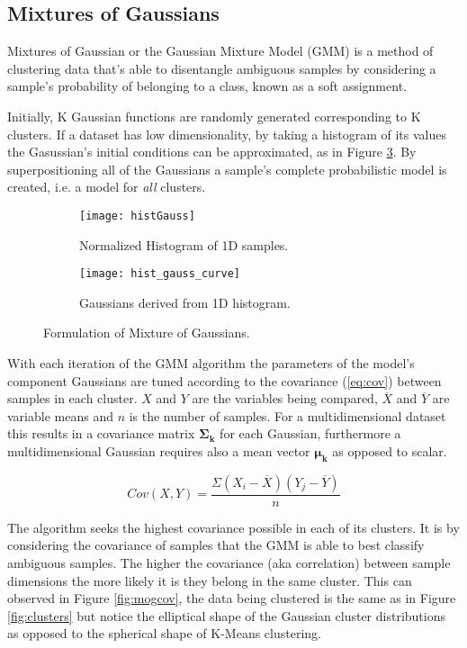  \subsection{Mixtures of Gaussians}

Mixtures of Gaussian or the Gaussian Mixture Model (GMM) is a method of clustering data that's able to disentangle ambiguous samples by considering a sample's probability of belonging to a class, known as a soft assignment. 

Initially, K Gaussian functions are randomly generated corresponding to K clusters. If a dataset has low dimensionality, by taking a histogram of its values the Gasussian's initial conditions can be approximated, as in Figure \ref{fig:mixture}. By superpositioning all of the Gaussians a sample's complete probabilistic model is created, i.e. a model for \emph{all} clusters. 

\begin{figure}[H]
	\centering
	\begin{subfigure}[b]{0.5\linewidth}
            \centering\texttt{[image: histGauss]}
      		\caption{Normalized Histogram of 1D samples.}
		\label{fig:histGauss}
    	\end{subfigure}%
    	\begin{subfigure}[b]{0.5\linewidth}
      		\centering\texttt{[image: hist\_gauss\_curve]}
      		\caption{Gaussians derived from 1D histogram. }
       		\label{fig:histCurve}
		\end{subfigure}
		\caption{Formulation of Mixture of Gaussians.}
    	\label{fig:mixture}
\end{figure}

With each iteration of the GMM algorithm the parameters of the model's component Gaussians are tuned according to the covariance (\ref{eq:cov}) between samples in each cluster. $X$ and $Y$ are the variables being compared, $\overline X$ and $\overline Y$ are variable means and $n$ is the number of samples. For a multidimensional dataset this results in a covariance matrix $\bm{\Sigma_k}$ for each Gaussian, furthermore a multidimensional Gaussian requires also a mean vector $\bm{\mu_k}$ as opposed to scalar. 

\begin{equation}
Cov(X, Y) = \frac{\Sigma(X_i-\overline X)(Y_j-\overline Y)}{n}
\label{eq:cov}
\end{equation}



The algorithm seeks the highest covariance possible in each of its clusters. It is by considering the covariance of samples that the GMM is able to best classify ambiguous samples. The higher the covariance (aka correlation) between sample dimensions the more likely it is they belong in the same cluster. This can observed in Figure \ref{fig:mogcov}, the data being clustered is the same as in Figure \ref{fig:clusters} but notice the elliptical shape of the Gaussian cluster distributions as opposed to the spherical shape of K-Means clustering.

